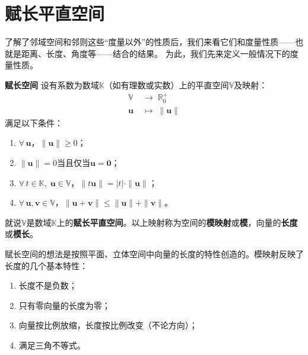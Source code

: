 \documentclass[12pt,UTF8]{ctexbook}
\begin{document}
\section{赋长平直空间}

了解了邻域空间和邻则这些“度量以外”的性质后，我们来看它们和度量性质——也就是距离、长度、角度等——结合的结果。
为此，我们先来定义一般情况下的度量性质。

\begin{df}{\textbf{赋长空间}}
    设有系数为数域$\mathbb{K}$（如有理数或实数）上的平直空间$\mathbb{V}$及映射：
    \begin{align*}
        \mathbb{V} \;&\rightarrow \;\mathbb{R}_0^+ \\
        \mathbf{u} \;&\mapsto \;\| \mathbf{u} \|
    \end{align*}
    满足以下条件：
    \begin{enumerate}
        \item $\forall \, \mathbf{u}$，$\|\mathbf{u}\| \geqslant 0$；
        \item $\| \mathbf{u} \| = 0$当且仅当$\mathbf{u} = \mathbf{0}$；
        \item $\forall \, t \in \mathbb{K}, \; \mathbf{u}\in \mathbb{V}$，$\| t\mathbf{u}\| = |t|\cdot \|\mathbf{u}\|$；
        \item $\forall \, \mathbf{u}, \mathbf{v} \in \mathbb{V}$，$\|\mathbf{u} + \mathbf{v}\| \leqslant \|\mathbf{u}\| + \|\mathbf{v}\|$。
    \end{enumerate}
    就说$\mathbb{V}$是数域$\mathbb{K}$上的\textbf{赋长平直空间}。以上映射称为空间的\textbf{模映射}或\textbf{模}，向量的\textbf{长度}或\textbf{模长}。
\end{df}

赋长空间的想法是按照平面、立体空间中向量的长度的特性创造的。模映射反映了长度的几个基本特性：
\begin{enumerate}
    \item 长度不是负数；
    \item 只有零向量的长度为零；
    \item 向量按比例放缩，长度按比例改变（不论方向）；
    \item 满足三角不等式。
\end{enumerate}
\end{document}
